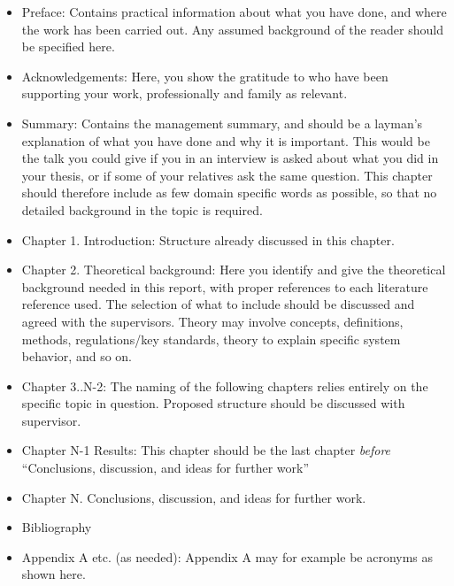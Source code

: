 \begin{itemize}
	\item Preface: Contains practical information about what you have done, and where the work has been carried out. Any assumed background of the reader should be specified here.
	\item Acknowledgements: Here, you show the gratitude to who have been supporting your work, professionally and family as relevant.
	\item Summary: Contains the management summary, and should be a layman's explanation of what you have done and why it is important. This would be the talk you could give if you in an  interview is asked about what you did in your thesis, or if some of your relatives ask the same question. This chapter should therefore include as few domain specific words as possible, so that no detailed background in the topic is required. 
	\item Chapter 1. Introduction: Structure already discussed in this chapter.
	\item Chapter 2. Theoretical background: Here you identify and give the theoretical background needed in this report, with proper references to each literature reference used. The selection of what to include should be discussed and agreed with the supervisors. Theory may involve concepts, definitions, methods, regulations/key standards, theory to explain specific system behavior, and so on.
	\item Chapter 3..N-2: The naming of the following chapters relies entirely on the specific topic in question. Proposed structure should be discussed with supervisor.
	\item Chapter N-1 Results: This chapter should be the last chapter \textit{before} ``Conclusions, discussion, and ideas for further work''
	\item Chapter N. Conclusions, discussion, and ideas for further work.
	\item Bibliography
	\item Appendix A etc. (as needed): Appendix A may for example be acronyms as shown here.
\end{itemize}

